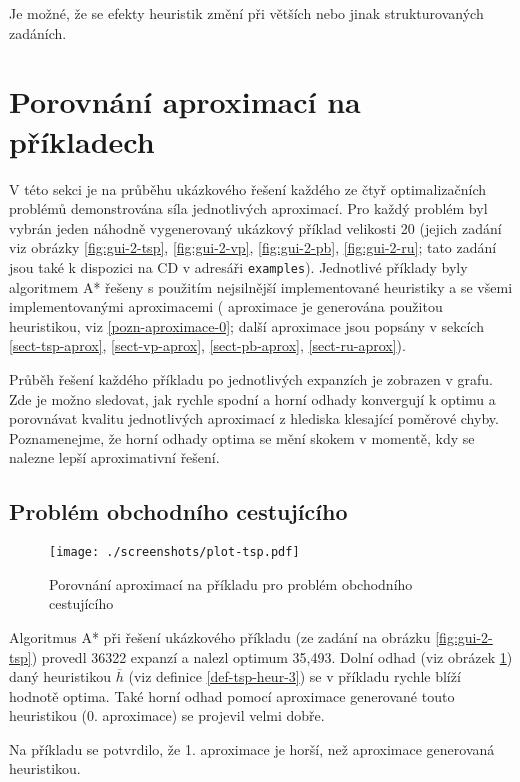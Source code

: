 \documentclass[12pt,notitlepage,fleqn]{report} %
\theoremstyle{definition}
\newcommand{\code}[1]{\texttt{#1}}
\begin{document}
Je možné, že se efekty heuristik změní při větších nebo jinak strukturovaných zadáních.

\section{Porovnání aproximací na příkladech}
V této sekci je na průběhu ukázkového řešení každého ze čtyř optimalizačních problémů demonstrována síla jednotlivých aproximací. Pro každý problém byl vybrán jeden náhodně vygenerovaný ukázkový příklad velikosti 20 (jejich zadání viz obrázky \ref{fig:gui-2-tsp}, \ref{fig:gui-2-vp}, \ref{fig:gui-2-pb}, \ref{fig:gui-2-ru}; tato zadání jsou také k dispozici na CD v adresáři \code{examples}). Jednotlivé příklady byly algoritmem A* řešeny s použitím nejsilnější implementované heuristiky a se všemi implementovanými aproximacemi ( aproximace je generována použitou heuristikou, viz \ref{pozn-aproximace-0}; další aproximace jsou popsány v sekcích \ref{sect-tsp-aprox}, \ref{sect-vp-aprox}, \ref{sect-pb-aprox}, \ref{sect-ru-aprox}).

Průběh řešení každého příkladu po jednotlivých expanzích je zobrazen v grafu. Zde je možno sledovat, jak rychle spodní a horní odhady konvergují k optimu a porovnávat kvalitu jednotlivých aproximací z hlediska klesající poměrové chyby. Poznamenejme, že horní odhady optima se mění skokem v momentě, kdy se nalezne lepší aproximativní řešení. 

\subsection{Problém obchodního cestujícího}
\begin{figure}[h]
 \centering
 \texttt{[image: ./screenshots/plot-tsp.pdf]}
 \caption{Porovnání aproximací na příkladu pro problém obchodního cestujícího}
 \label{fig:plot-tsp}
\end{figure}
Algoritmus A* při řešení ukázkového příkladu (ze zadání na obrázku \ref{fig:gui-2-tsp}) provedl 36322 expanzí a nalezl optimum 35,493.
Dolní odhad (viz obrázek \ref{fig:plot-tsp}) daný heuristikou $\overline{h}$ (viz definice \ref{def-tsp-heur-3}) se v příkladu rychle blíží hodnotě optima. Také horní odhad pomocí aproximace generované touto heuristikou (0. aproximace) se projevil velmi dobře.

Na příkladu se potvrdilo, že 1. aproximace je horší, než aproximace generovaná heuristikou.
\end{document}
